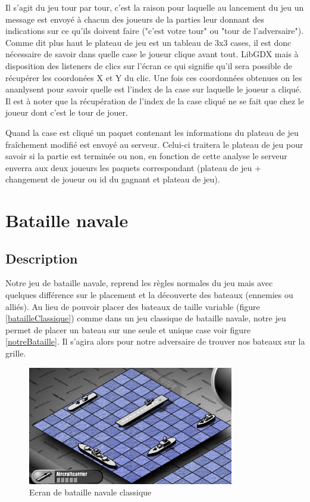 \documentclass{report}
\begin{document}
Il s'agit du jeu tour par tour, c'est la raison pour laquelle au lancement du jeu un message est envoyé à chacun des joueurs de la parties
leur donnant des indications sur ce qu'ils doivent faire ("c'est votre tour" ou "tour de l'adversaire").
Comme dit plus haut le plateau de jeu est un tableau de 3x3 cases, il est donc nécessaire
de savoir dans quelle case le joueur clique avant tout. LibGDX mais à disposition des listeners de clics sur l'écran ce qui signifie qu'il sera possible
de récupérer les coordonées X et Y du clic. Une fois ces coordonnées obtenues on les ananlysent pour savoir quelle est l'index de la case sur laquelle
le joueur a cliqué. Il est à noter que la récupération de l'index de la case cliqué ne se fait que chez le joueur dont c'est le tour de jouer.

Quand la case est cliqué un paquet contenant les informations du plateau de jeu fraîchement modifié est envoyé au serveur. Celui-ci traitera le plateau de jeu
pour savoir si la partie est terminée ou non, en fonction de cette analyse le serveur enverra aux deux joueurs les paquets correspondant (plateau de jeu +
 changement de joueur ou id du gagnant et plateau de jeu).

\section{Bataille navale}
\label{Bataille navale}

\subsection{Description}
Notre jeu de bataille navale, reprend les règles normales du jeu mais avec quelques différence sur le placement et la découverte des bateaux (ennemies ou alliés). Au lieu de pouvoir placer
des bateaux de taille variable (figure \ref{batailleClassique}) comme dans un jeu classique de bataille navale, notre jeu permet de placer un bateau sur une seule et unique case
voir figure \ref{notreBataille}. Il s'agira alors pour notre adversaire de trouver nos bateaux sur la grille.

\begin{figure}[H]
	\centering\includegraphics[width=9cm]{batailleClassique}
	\caption{Ecran de bataille navale classique}
	\label{batailleClassiqe}
\end{figure}
\end{document}
